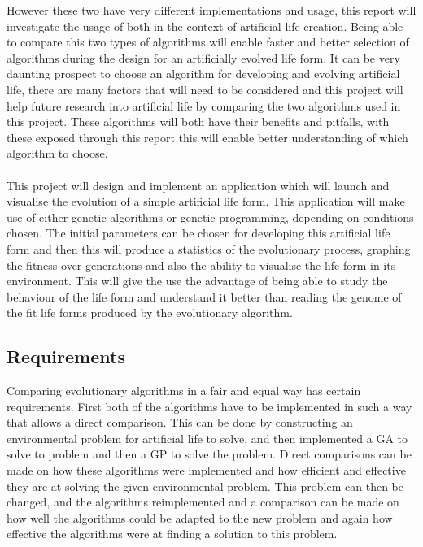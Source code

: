 \documentclass[12pt]{article}
\begin{document}
However these two have very different implementations and usage, this report will investigate the usage of both in the context of artificial life creation. 
Being able to compare this two types of algorithms will enable faster and better selection of algorithms during 
the design for an artificially evolved life form. It can be very daunting prospect to choose an algorithm
for developing and evolving artificial life, there are many factors that will need to be considered and this
project will help future research into artificial life by comparing the two algorithms used in this project.
These algorithms will both have their benefits and pitfalls, with these exposed through this report this 
will enable better understanding of which algorithm to choose.


\paragraph{}
This project will design and implement an application which will launch and visualise the evolution of a
simple artificial life form. This application will make use of either genetic algorithms or genetic programming,
depending on conditions chosen. The initial parameters can be chosen for developing this artificial life form
and then this will produce a statistics of the evolutionary process, graphing the fitness over generations
and also the ability to visualise the life form in its environment. This will give the use the advantage of being
able to study the behaviour of the life form and understand it better than reading the genome of the fit life forms
produced by the evolutionary algorithm.


\paragraph{}

\subsection{Requirements}
Comparing evolutionary algorithms in a fair and equal way has certain requirements. First both of the algorithms have to be implemented in such a way that allows a direct comparison. 
This can be done by constructing an environmental problem for artificial life to solve, and then implemented a GA to solve to problem and then a GP to solve the problem. Direct
comparisons can be made on how these algorithms were implemented and how efficient and effective they are at solving the given environmental problem. This problem can then be changed, 
and the algorithms reimplemented and a comparison can be made on how well the algorithms could be adapted to the new problem and again how effective the algorithms were at
finding a solution to this problem.
\end{document}
